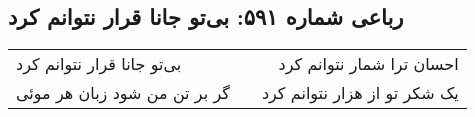\begin{center}
\section*{رباعی شماره ۵۹۱: بی‌تو جانا قرار نتوانم کرد}
\label{sec:0591}
\begin{longtable}{l p{0.5cm} r}
بی‌تو جانا قرار نتوانم کرد
&&
احسان ترا شمار نتوانم کرد
\\
گر بر تن من شود زبان هر موئی
&&
یک شکر تو از هزار نتوانم کرد
\\
\end{longtable}
\end{center}
